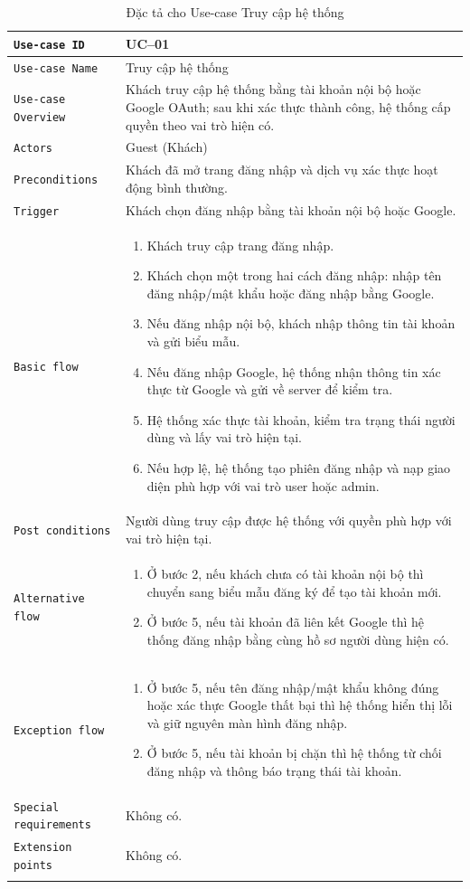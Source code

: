 \begin{longtable}{|P{4.8cm}|m{10cm}|}\hline
	\texttt{Use-case ID} & UC--01\\
	\hline
	\texttt{Use-case Name} & Truy cập hệ thống\\
	\hline
	\texttt{Use-case Overview} & Khách truy cập hệ thống bằng tài khoản nội bộ hoặc Google OAuth; sau khi xác thực thành công, hệ thống cấp quyền theo vai trò hiện có.
	\\
	\hline
	\texttt{Actors} & Guest (Khách)
	\\
	\hline
	\texttt{Preconditions} & Khách đã mở trang đăng nhập và dịch vụ xác thực hoạt động bình thường.
	\\
	\hline
	\texttt{Trigger} & Khách chọn đăng nhập bằng tài khoản nội bộ hoặc Google.\\
	\hline
	\texttt{Basic flow} &
	\begin{enumerate}
		\item Khách truy cập trang đăng nhập.
		\item Khách chọn một trong hai cách đăng nhập: nhập tên đăng nhập/mật khẩu hoặc đăng nhập bằng Google.
		\item Nếu đăng nhập nội bộ, khách nhập thông tin tài khoản và gửi biểu mẫu.
		\item Nếu đăng nhập Google, hệ thống nhận thông tin xác thực từ Google và gửi về server để kiểm tra.
		\item Hệ thống xác thực tài khoản, kiểm tra trạng thái người dùng và lấy vai trò hiện tại.
		\item Nếu hợp lệ, hệ thống tạo phiên đăng nhập và nạp giao diện phù hợp với vai trò user hoặc admin.
	\end{enumerate}
	\\
	\hline
	\texttt{Post conditions} &
	Người dùng truy cập được hệ thống với quyền phù hợp với vai trò hiện tại.
	\\
	\hline
	\texttt{Alternative flow} &
	\begin{enumerate}[label = A\arabic*.]
		\item Ở bước 2, nếu khách chưa có tài khoản nội bộ thì chuyển sang biểu mẫu đăng ký để tạo tài khoản mới.
		\item Ở bước 5, nếu tài khoản đã liên kết Google thì hệ thống đăng nhập bằng cùng hồ sơ người dùng hiện có.
	\end{enumerate}
	\\
	\hline
	\texttt{Exception flow} &
	\begin{enumerate}[label = E\arabic*:]
		\item Ở bước 5, nếu tên đăng nhập/mật khẩu không đúng hoặc xác thực Google thất bại thì hệ thống hiển thị lỗi và giữ nguyên màn hình đăng nhập.
		\item Ở bước 5, nếu tài khoản bị chặn thì hệ thống từ chối đăng nhập và thông báo trạng thái tài khoản.
	\end{enumerate}
	\\
	\hline
	\texttt{Special requirements} & Không có.\\
	\hline
	\texttt{Extension points} & Không có.\\
	\hline

	\caption{\label{table2}Đặc tả cho Use-case Truy cập hệ thống}
\end{longtable}
